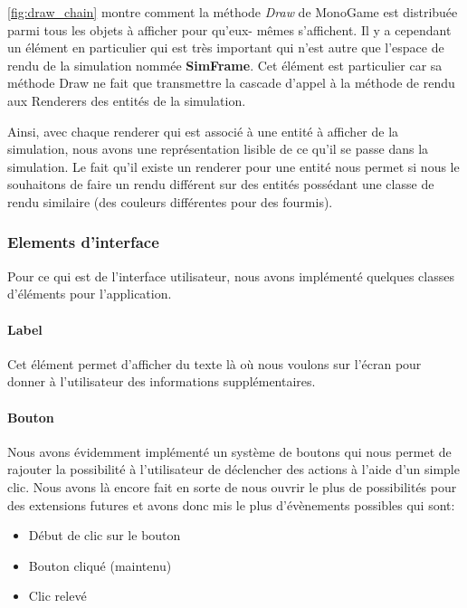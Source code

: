 \documentclass{EPUProjetDi}
\begin{document}
\autoref{fig:draw_chain} montre comment la méthode \textit{Draw} de MonoGame est distribuée parmi tous les objets à afficher pour qu'eux-
mêmes s'affichent.
Il y a cependant un élément en particulier qui est très important qui n'est autre que l'espace de rendu de la simulation nommée \textbf{SimFrame}.
Cet élément est particulier car sa méthode Draw ne fait que transmettre la cascade d'appel à la méthode de rendu aux Renderers des entités
de la simulation.

Ainsi, avec chaque renderer qui est associé à une entité à afficher de la simulation, nous avons une représentation lisible de ce qu'il
se passe dans la simulation. Le fait qu'il existe un renderer pour une entité nous permet si nous le souhaitons de faire un rendu différent
sur des entités possédant une classe de rendu similaire (des couleurs différentes pour des fourmis).

\subsubsection{Elements d'interface}

Pour ce qui est de l'interface utilisateur, nous avons implémenté quelques classes d'éléments pour l'application.

\paragraph{Label}
Cet élément permet d'afficher du texte là où nous voulons sur l'écran pour donner à l'utilisateur des informations supplémentaires.

\paragraph{Bouton}

Nous avons évidemment implémenté un système de boutons qui nous permet de rajouter la possibilité à l'utilisateur de déclencher des actions à l'aide d'un 
simple clic. Nous avons là encore fait en sorte de nous ouvrir le plus de possibilités pour des extensions futures et avons donc mis le plus d'évènements 
possibles qui sont:
\begin{itemize}
    \item Début de clic sur le bouton
    \item Bouton cliqué (maintenu)
    \item Clic relevé
\end{itemize}
\end{document}
